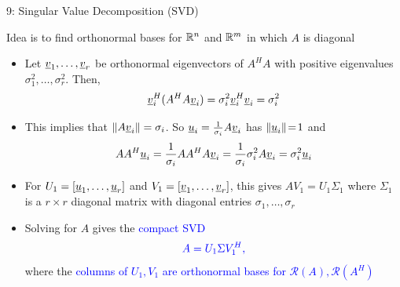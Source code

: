 \documentclass[10pt,letterpaper,english]{beamer}
\begin{document}
\begin{frame}{9: Singular Value Decomposition (SVD)}

Idea is to find orthonormal bases for $\mathbb{R}^n$ and $\mathbb{R}^m$ in which $A$ is diagonal

\begin{itemize}
\setlength\itemsep{3mm}

\item Let $\underline{v}_1, \ldots, \underline{v}_r$ be orthonormal eigenvectors of $A^H A$ with positive eigenvalues $\sigma_1^2,\ldots,\sigma_r^2$.
Then, \[\underline{v}_i^H (A^H A \underline{v}_i) = \sigma_i^2 \underline{v}_i^H \underline{v}_i = \sigma_i^2 \]

\item This implies that $\|A \underline{v}_i\| = \sigma_i$.
So $\underline{u}_i = \frac{1}{\sigma_i} A\underline{v}_i$ has $\| \underline{u}_i \| \!=\! 1$ and
\[A A^H \underline{u}_i = \frac{1}{\sigma_i} A A^H A \underline{v}_i = \frac{1}{\sigma_i} \sigma_i^2 A \underline{v}_i = \sigma_i^2 \underline{u}_i \]


\item For $U_1 = [\underline{u}_1,\ldots,\underline{u}_r]
$ and $V_1 = [\underline{v}_1,\ldots,\underline{v}_r]$, this gives $A V_1 = U_1 \Sigma_1$ where $\Sigma_1$ is a $r \times r$ diagonal matrix with diagonal entries $\sigma_1,\ldots,\sigma_r$

\item Solving for $A$ gives the \textcolor{blue}{compact SVD} \vspace{-1mm} \[ \color{blue} A = U_1 \Sigma V_1^H, \vspace{-1mm}\]
where the \textcolor{blue}{columns of $U_1, V_1$ are orthonormal bases for $\mathcal{R}(A), \mathcal{R}(A^H)$}

\end{itemize}


\end{frame}
\end{document}
